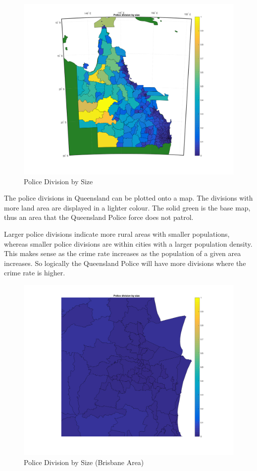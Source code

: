 \documentclass[]{article}
\begin{document}
\begin{figure}[H]
    \caption{Police Division by Size}
    \centering
    \label{fig:police_divisions}
    \includegraphics[width=\linewidth]{../images/police_division_by_size}
\end{figure}

The police divisions in Queensland can be plotted onto a map. The divisions with more land area are displayed in a lighter colour. The solid green is the base map, thus an area that the Queensland Police force does not patrol.

Larger police divisions indicate more rural areas with smaller populations, whereas smaller police divisions are within cities with a larger population density.
This makes sense as the crime rate increases as the population of a given area increases\cite{nolan_establishing_2004}.
So logically the Queensland Police will have more divisions where the crime rate is higher.

\begin{figure}[H]
    \caption{Police Division by Size (Brisbane Area)}
    \centering
    \includegraphics[width=\linewidth]{../images/police_division_by_size_brisbane}
\end{figure}
\end{document}
